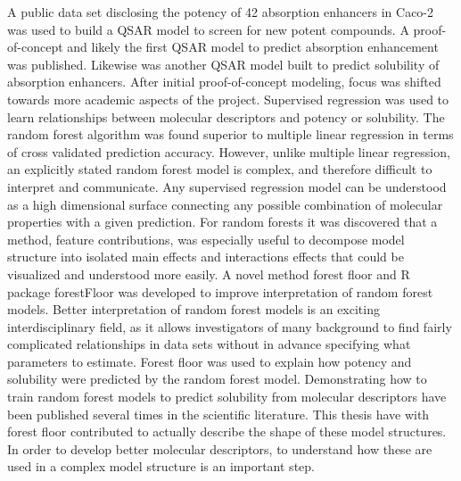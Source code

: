 A public data set disclosing the potency of 42 absorption enhancers in Caco-2 was used to build a QSAR model to screen for new potent compounds. A proof-of-concept and likely the first QSAR model to predict absorption enhancement was published. Likewise was another QSAR model built to predict solubility of absorption enhancers. After initial proof-of-concept modeling, focus was shifted towards more academic aspects of the project. Supervised regression was used to learn relationships between molecular descriptors and potency or solubility. The random forest algorithm was found superior to multiple linear regression in terms of cross validated prediction accuracy. However, unlike multiple linear regression, an explicitly stated random forest model is complex, and therefore difficult to interpret and communicate. Any supervised regression model can be understood as a high dimensional surface connecting any possible combination of molecular properties with a given prediction. For random forests it was discovered that a method, feature contributions, was especially useful to decompose model structure into isolated main effects and interactions effects that could be visualized and understood more easily. A novel method forest floor and R package forestFloor was developed to improve interpretation of random forest models. Better interpretation of random forest models is an exciting interdisciplinary field, as it allows investigators of many background to find fairly complicated relationships in data sets without in advance specifying what parameters to estimate. Forest floor was used to explain how potency and solubility were predicted by the random forest model. Demonstrating how to train random forest models to predict solubility from molecular descriptors have been published several times in the scientific literature. This thesis have with forest floor contributed to actually describe the shape of these model structures. In order to develop better molecular descriptors, to understand how these are used in a complex model structure is an important step.